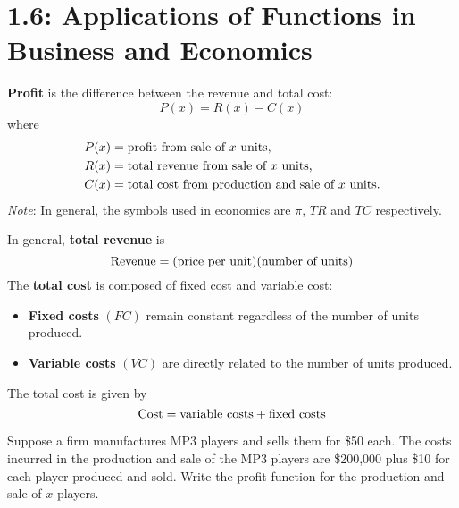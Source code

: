 \documentclass[../mathNotesPreamble]{subfiles}
\providecommand{\relscalefact}{1.4}
\begin{document}
\relscale{\relscalefact}
  \section{1.6: Applications of Functions in Business and Economics}
  \begin{defn*}
    \textbf{Profit} is the difference between the revenue and total cost:
      \[P(x)=R(x)-C(x)\]
    where
      \begin{align*}
        P(x)&= \textnormal{profit from sale of $x$ units,}\\
        R(x)&= \textnormal{total revenue from sale of $x$ units,}\\
        C(x)&= \textnormal{total cost from production and sale of $x$ units.}
      \end{align*}
    \emph{Note}: In general, the symbols used in economics are $\pi$, $TR$ and $TC$ respectively.

    \vspace*{\baselineskip}
    In general, \textbf{total revenue} is
      \[\textnormal{Revenue}={\left(\textnormal{price per unit}\right)}{\left(\textnormal{number of units}\right)}\]
    The \textbf{total cost} is composed of fixed cost and variable cost:
    \begin{itemize}
      \item \textbf{Fixed costs} $(FC)$ remain constant regardless of the number of units produced.
      \item \textbf{Variable costs} $(VC)$ are directly related to the number of units produced.
    \end{itemize}
    The total cost is given by
      \[\textnormal{Cost}=\textnormal{variable costs}+\textnormal{fixed costs}\]
  \end{defn*}
  \pagebreak

  \begin{ex*}
    Suppose a firm manufactures MP3 players and sells them for \$50 each. The costs incurred in the production and sale of the MP3 players are \$200,000 plus \$10 for each player produced and sold. Write the profit function for the production and sale of $x$ players.
  \end{ex*}
\end{document}
